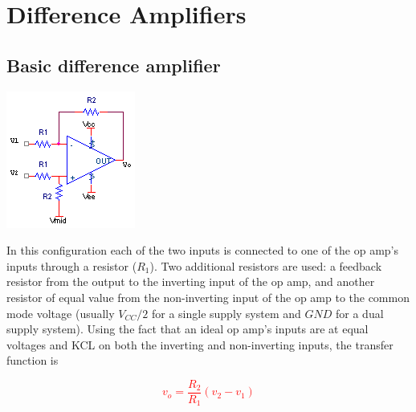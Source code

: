 \section{Difference Amplifiers}

\subsection{Basic difference amplifier}
\begin{center}
	\includegraphics{schematics/differenceamp.PNG}
\end{center}
In this configuration each of the two inputs is connected to one of the op amp's inputs through a resistor ($R_{1}$). Two additional resistors are used: a feedback resistor from the output to the inverting input of the op amp, and another resistor of equal value from the non-inverting input of the op amp to the common mode voltage (usually $V_{CC}/2$ for a single supply system and $GND$ for a dual supply system). Using the fact that an ideal op amp's inputs are at equal voltages and KCL on both the inverting and non-inverting inputs, the transfer function is

\textcolor{red}{
\begin{equation}
v_{o} = \frac{R_{2}}{R_{1}}(v_{2}-v_{1})
\label{eq:differenceamp}
\end{equation}
}

